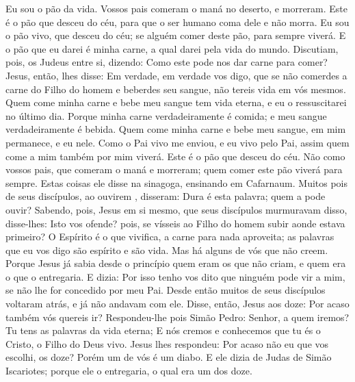 {  Eu sou o pão da vida.
  Vossos pais comeram o maná no deserto, e morreram.
  Este é o pão que desceu do céu, para que o ser humano coma dele e não morra.
  Eu sou o pão vivo, que desceu do céu; se alguém comer deste pão, para sempre viverá. E o pão que eu darei é minha carne, a qual darei pela vida do mundo.
  Discutiam, pois, os Judeus entre si, dizendo: Como este pode nos dar
{} carne para comer?
  Jesus, então, lhes disse: Em verdade, em verdade vos digo, que se não comerdes a carne do Filho do homem e beberdes seu sangue, não tereis vida em vós mesmos.
  Quem come minha carne e bebe meu sangue tem vida eterna, e eu o ressuscitarei no último dia.
  Porque minha carne verdadeiramente é comida; e meu sangue verdadeiramente é bebida.
  Quem come minha carne e bebe meu sangue, em mim permanece, e eu nele.
  Como o Pai vivo me enviou, e eu vivo pelo Pai, assim quem come a mim também por mim viverá.
  Este é o pão que desceu do céu. Não como vossos pais, que comeram o maná e morreram; quem comer este pão viverá para sempre.
  Estas coisas ele disse na sinagoga, ensinando em Cafarnaum.
  Muitos pois de seus discípulos, ao ouvirem
{},  disseram: Dura é esta palavra; quem a pode ouvir?
  Sabendo, pois, Jesus em si mesmo, que seus discípulos murmuravam disso, disse-lhes: Isto vos ofende?
   pois, se vísseis ao Filho do homem subir aonde estava primeiro?
  O Espírito é o que vivifica, a carne para nada aproveita; as palavras que eu vos digo são espírito e são vida.
  Mas há alguns de vós que não creem. Porque Jesus já sabia desde o princípio quem eram os que não criam, e quem era o que o entregaria.
  E dizia: Por isso tenho vos dito que ninguém pode vir a mim, se não lhe for concedido por meu Pai.
  Desde então muitos de seus discípulos voltaram atrás, e já não andavam com ele.
  Disse, então, Jesus aos doze: Por acaso também vós quereis ir?
  Respondeu-lhe pois Simão Pedro: Senhor, a quem iremos? Tu tens as palavras da vida eterna;
  E nós cremos e conhecemos que tu és o Cristo, o Filho do Deus vivo.
  Jesus lhes respondeu: Por acaso não
{} eu que vos escolhi, os doze? Porém um de vós é um diabo.
  E ele dizia
{} de Judas de Simão Iscariotes; porque ele o entregaria, o qual era um dos doze.
\par }

